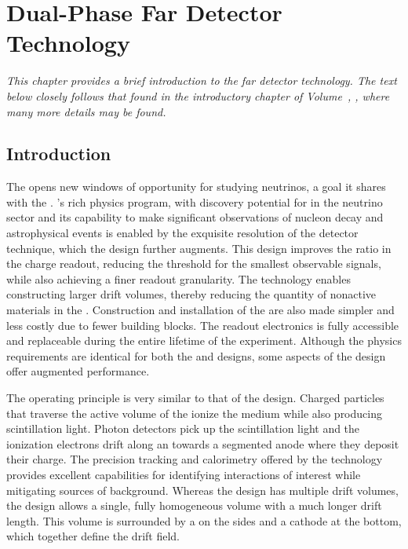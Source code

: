 \chapter{Dual-Phase Far Detector Technology}
\label{ch:exec-dp}

\textit{This chapter provides a brief introduction to the  far detector technology.  The text below closely follows that found in the introductory chapter of Volume~\volnumberdp{}, \voltitledp{}, where many more details may be found.}

\section{Introduction}
\label{sec:dp-execsum-introduction}



The    opens new windows of opportunity for studying neutrinos, a goal it shares with the .  
%
 's rich physics program, with discovery potential for  in the neutrino sector and its capability to make significant observations of nucleon decay and astrophysical events is enabled by the exquisite resolution of the  detector technique, which the  design further augments. This design improves the  ratio in the charge readout, reducing the threshold for the smallest observable signals, while also achieving a finer readout granularity.  The  technology enables constructing larger drift volumes, thereby reducing  the quantity of nonactive materials in the . Construction and installation of the  are also made simpler and less costly due to fewer building blocks. The readout electronics is fully accessible and replaceable during the entire lifetime of the experiment. Although the physics requirements are identical for both the  and  designs, some aspects of the  design offer augmented performance. 

The operating principle is very similar to that of the  design.  Charged particles that traverse the active volume of the  ionize the medium while also producing scintillation light.  Photon detectors pick up the scintillation light and the ionization electrons drift along an \efield towards a segmented anode where they deposit their charge. The precision tracking and calorimetry offered by the  technology provides excellent capabilities for identifying interactions of interest while mitigating sources of background.  Whereas the  design has multiple drift volumes, the  design allows a single, fully homogeneous  volume with a much longer drift length. This volume is surrounded by a  on the sides and a cathode at the bottom, which together define the drift field. 

